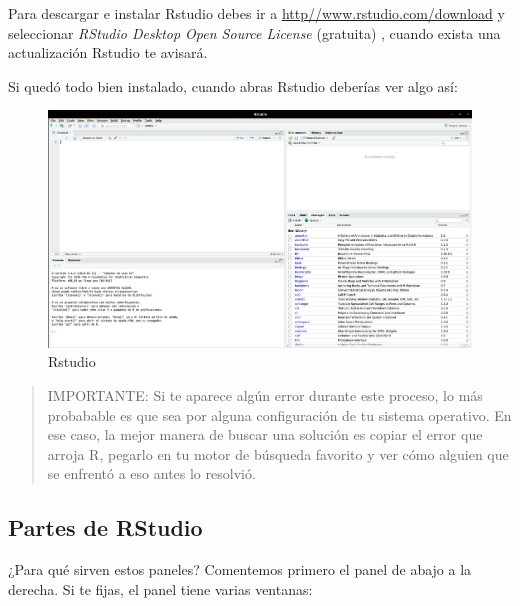 \documentclass[12pt,]{book}
\begin{document}
Para descargar e instalar Rstudio debes ir a
\url{http//www.rstudio.com/download} y seleccionar \emph{RStudio Desktop
Open Source License} (gratuita) , cuando exista una actualización
Rstudio te avisará.

Si quedó todo bien instalado, cuando abras Rstudio deberías ver algo
así:

\begin{figure}

{\centering \includegraphics[width=0.5\linewidth]{images/rstudio} 

}

\caption{Rstudio}\label{fig:fig3}
\end{figure}

\begin{quote}
IMPORTANTE: Si te aparece algún error durante este proceso, lo más
probabable es que sea por alguna configuración de tu sistema operativo.
En ese caso, la mejor manera de buscar una solución es copiar el error
que arroja R, pegarlo en tu motor de búsqueda favorito y ver cómo
alguien que se enfrentó a eso antes lo resolvió.
\end{quote}

\subsection{Partes de RStudio}\label{partes-de-rstudio}

¿Para qué sirven estos paneles? Comentemos primero el panel de abajo a
la derecha. Si te fijas, el panel tiene varias ventanas:
\end{document}
